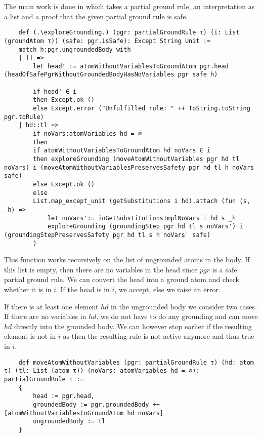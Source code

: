     The main work is done in \exploreGrounding which takes a partial ground rule, an interpretation as a list and a proof that the given partial ground rule is safe.

    \begin{lstlisting}
    def (.\exploreGrounding.) (pgr: partialGroundRule τ) (i: List (groundAtom τ)) (safe: pgr.isSafe): Except String Unit :=
    match h:pgr.ungroundedBody with
    | [] =>
        let head' := atomWithoutVariablesToGroundAtom pgr.head (headOfSafePgrWithoutGroundedBodyHasNoVariables pgr safe h)

        if head' ∈ i
        then Except.ok ()
        else Except.error ("Unfulfilled rule: " ++ ToString.toString pgr.toRule)
    | hd::tl =>
        if noVars:atomVariables hd = ∅
        then
        if atomWithoutVariablesToGroundAtom hd noVars ∈ i
        then exploreGrounding (moveAtomWithoutVariables pgr hd tl noVars) i (moveAtomWithoutVariablesPreservesSafety pgr hd tl h noVars safe)
        else Except.ok ()
        else
        List.map_except_unit (getSubstitutions i hd).attach (fun ⟨s, _h⟩ =>
            let noVars':= inGetSubstitutionsImplNoVars i hd s _h
            exploreGrounding (groundingStep pgr hd tl s noVars') i (groundingStepPreservesSafety pgr hd tl s h noVars' safe)
        )
    \end{lstlisting}

    This function works recursively on the list of ungrounded atoms in the body. If this list is empty, then there are no variables in the head since $pgr$ is a safe partial ground rule. We can convert the head into a ground atom and check whether it is in $i$. If the head is in $i$, we accept, else we raise an error.

    If there is at least one element $hd$ in the ungrounded body we consider two cases. If there are no variables in $hd$, we do not have to do any grounding and can move $hd$ directly into the grounded body. We can however stop earlier if the resulting element is not in $i$ as then the resulting rule is not active anymore and thus true in $i$.

    \begin{lstlisting}
    def moveAtomWithoutVariables (pgr: partialGroundRule τ) (hd: atom τ) (tl: List (atom τ)) (noVars: atomVariables hd = ∅): partialGroundRule τ :=
    {
        head := pgr.head,
        groundedBody := pgr.groundedBody ++ [atomWithoutVariablesToGroundAtom hd noVars]
        ungroundedBody := tl
    }
    \end{lstlisting}


